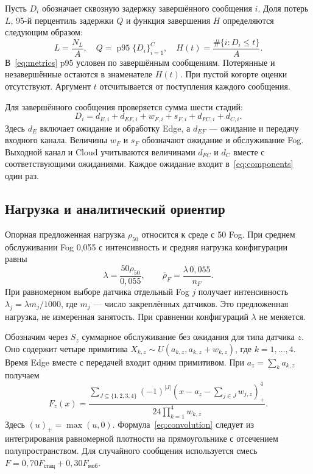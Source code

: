 \documentclass{psta}
\begin{document}
Пусть $D_i$ обозначает сквозную задержку завершённого сообщения $i$. Доля потерь $L$, 95-й перцентиль задержки $Q$ и функция завершения $H$ определяются следующим образом:
\begin{equation}\label{eq:metrics}
 L=\frac{N_L}{A},\quad Q=\operatorname{p95}\{D_i\}_{i=1}^{C},\quad
 H(t)=\frac{\#\{i:D_i\leq t\}}{A}.
\end{equation}
В~\eqref{eq:metrics} p95 условен по завершённым сообщениям. Потерянные и незавершённые остаются в знаменателе $H(t)$. При пустой когорте оценки отсутствуют. Аргумент $t$ отсчитывается от поступления каждого сообщения.

Для завершённого сообщения проверяется сумма шести стадий:
\begin{equation}\label{eq:components}
 D_i=d_{E,i}+d_{EF,i}+w_{F,i}+s_{F,i}+d_{FC,i}+d_{C,i}.
\end{equation}
Здесь $d_E$ включает ожидание и обработку Edge, а $d_{EF}$ --- ожидание и передачу входного канала. Величины $w_F$ и $s_F$ обозначают ожидание и обслуживание Fog. Выходной канал и Cloud учитываются величинами $d_{FC}$ и $d_C$ вместе с соответствующими ожиданиями. Каждое ожидание входит в~\eqref{eq:components} один раз.

\subsection{Нагрузка и аналитический ориентир}
Опорная предложенная нагрузка $\rho_{50}$ относится к среде с 50 Fog. При среднем обслуживании Fog 0,055 с интенсивность и средняя нагрузка конфигурации равны
\begin{equation}\label{eq:load}
 \lambda=\frac{50\rho_{50}}{0{,}055},\qquad
 \overline\rho_F=\frac{\lambda\,0{,}055}{n_F}.
\end{equation}
При равномерном выборе датчика отдельный Fog $j$ получает интенсивность $\lambda_j=\lambda m_j/1000$, где $m_j$ --- число закреплённых датчиков. Это предложенная нагрузка, не измеренная занятость. При сравнении конфигураций $\lambda$ не меняется.

Обозначим через $S_z$ суммарное обслуживание без ожидания для типа датчика $z$. Оно содержит четыре примитива $X_{k,z}\sim U(a_{k,z},a_{k,z}+w_{k,z})$, где $k=1,\ldots,4$. Время Edge вместе с передачей входит одним примитивом. При $a_z=\sum_k a_{k,z}$ получаем
\begin{equation}\label{eq:convolution}
 F_z(x)=\frac{\displaystyle\sum_{J\subseteq\{1,2,3,4\}}(-1)^{|J|}
 \left(x-a_z-\sum_{j\in J}w_{j,z}\right)_+^4}
 {24\prod_{k=1}^{4}w_{k,z}}.
\end{equation}
Здесь $(u)_+=\max(u,0)$. Формула~\eqref{eq:convolution} следует из интегрирования равномерной плотности на прямоугольнике с отсечением полупространством. Для случайного сообщения используется смесь $F=0{,}70F_{\text{стац}}+0{,}30F_{\text{моб}}$.
\end{document}
